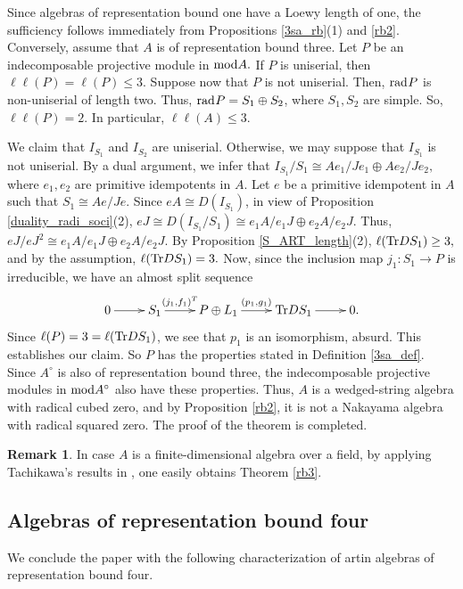 \documentclass[10pt]{amsart}
\theoremstyle{definition}
\newtheorem{Remark}[Theo]{Remark}
\newcommand{\mmod}{{\rm mod}}
\newcommand{\rad}{{\rm rad}\hspace{.5pt}}
\newcommand{\vp}{\vspace{.5pt}}
\begin{document}
\vspace{-1.5pt}

 Since algebras of representation bound one have a Loewy length of one, the sufficiency follows immediately from Propositions \ref{3sa_rb}(1) and \ref{rb2}. Conversely, assume that $A$ is of representation bound three. Let $P$ be an indecomposable projective module in $\mmod A.$ If $P$ is uniserial, then $\ell\ell(P)=\ell(P)\le 3.$ Suppose now that $P$ is not uniserial. Then, $\rad P$ is non-uniserial of length two. Thus, $\rad P=S_1\oplus S_2$, where $S_1, S_2$ are simple. So, $\ell\ell(P)=2$. In particular, $\ell\ell(A)\le 3.$

We claim that $I_{S_1}$ and $I_{S_2}$ are uniserial. Otherwise, we may suppose that $I_{S_1}$ is not uniserial. By a dual argument, we infer that $I_{S_1}/S_1\cong Ae_1/Je_1\oplus Ae_2/Je_2,$ where $e_1, e_2$ are primitive idempotents in $A$. Let $e$ be a primitive idempotent in $A$ such that $S_1\cong Ae/Je.$ \vp Since $eA\cong D(I_{S_1})$, in view of Proposition \ref{duality_radi_soci}(2), $eJ\cong D(I_{S_1}/S_1)\cong e_1A/e_1J\oplus e_2A/e_2J.$ \vp Thus, $eJ/eJ^2\cong e_1A/e_1J\oplus e_2A/e_2J.$ By Proposition \ref{S_ART_length}(2), $\ell({\rm Tr}DS_1)\ge 3,$ and by the assumption, $\ell({\rm Tr}DS_1)=3.$ Now, since the inclusion map $j_1: S_1\to P$ is irreducible, we have an almost split sequence \vspace{-12pt}
$$\xymatrix{0\ar[r]& S_1 \ar[r]^-{(j_1, f_1)^T} & P\oplus L_1 \ar[r]^-{(p_1, g_1)} & {\rm Tr}DS_1 \ar[r] & 0.}\vspace{-3pt}$$ 
Since $\ell(P)=3=\ell({\rm Tr}DS_1)$, we see that $p_1$ is an isomorphism, absurd. This establishes our claim. So $P$ has the properties stated in Definition \ref{3sa_def}. Since $A^\circ$ is also  of representation bound three, the indecomposable projective modules in $\mmod A^\circ$ also have these properties. Thus, $A$ is a wedged-string algebra with radical cubed zero, and  by Proposition \ref{rb2}, it is not a Nakayama algebra with radical squared zero. The proof of the theorem is completed.

\begin{Remark} 

In case $A$ is a finite-dimensional algebra over a field, by applying Tachikawa's results in \cite{Tac1}, one easily obtains Theorem \ref{rb3}.

\end{Remark}

\subsection{\sc Algebras of representation bound four} We conclude the paper with the following characterization of artin algebras of representation bound four. 
\end{document}
